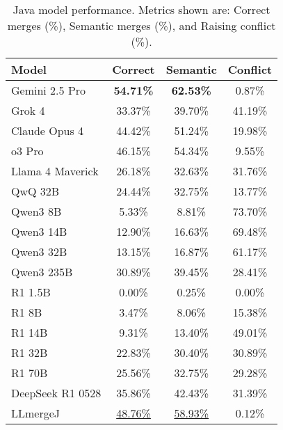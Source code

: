 \begin{table}[ht]
\centering
\footnotesize
\begin{tabular}{lccc}
\toprule
Model & Correct & Semantic & Conflict \\
\midrule
Gemini 2.5 Pro & \textbf{54.71\%} & \textbf{62.53\%} & 0.87\% \\
Grok 4 & 33.37\% & 39.70\% & 41.19\% \\
Claude Opus 4 & 44.42\% & 51.24\% & 19.98\% \\
o3 Pro & 46.15\% & 54.34\% & 9.55\% \\
Llama 4 Maverick & 26.18\% & 32.63\% & 31.76\% \\
QwQ 32B & 24.44\% & 32.75\% & 13.77\% \\
Qwen3 8B & 5.33\% & 8.81\% & 73.70\% \\
Qwen3 14B & 12.90\% & 16.63\% & 69.48\% \\
Qwen3 32B & 13.15\% & 16.87\% & 61.17\% \\
Qwen3 235B & 30.89\% & 39.45\% & 28.41\% \\
R1 1.5B & 0.00\% & 0.25\% & 0.00\% \\
R1 8B & 3.47\% & 8.06\% & 15.38\% \\
R1 14B & 9.31\% & 13.40\% & 49.01\% \\
R1 32B & 22.83\% & 30.40\% & 30.89\% \\
R1 70B & 25.56\% & 32.75\% & 29.28\% \\
DeepSeek R1 0528 & 35.86\% & 42.43\% & 31.39\% \\
LLmergeJ & \underline{48.76\%} & \underline{58.93\%} & 0.12\% \\
\bottomrule
\end{tabular}
\caption{Java model performance. Metrics shown are: Correct merges (\%), Semantic merges (\%), and Raising conflict (\%).}
\label{tab:java-results}
\end{table}
